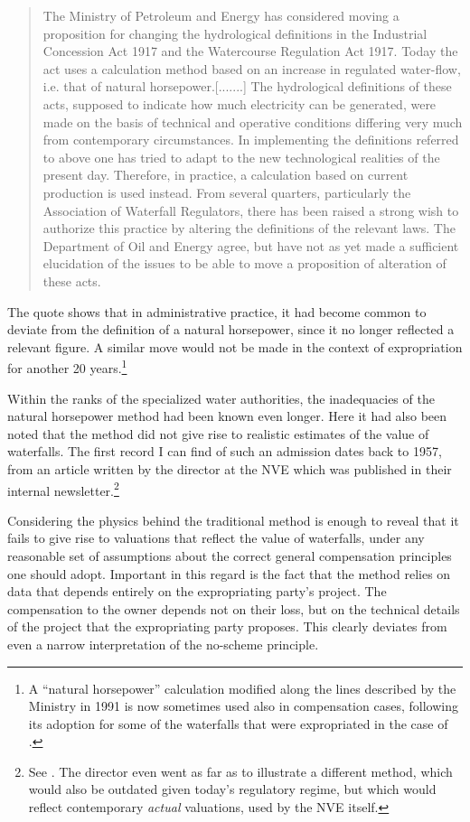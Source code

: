 \begin{quote}
The Ministry of Petroleum and Energy has considered moving a proposition for changing the hydrological definitions in the Industrial Concession Act 1917 and the Watercourse Regulation Act 1917. Today the act uses a calculation method based on an increase in regulated water-flow, i.e. that of natural horsepower.[.......] The hydrological definitions of these acts, supposed to indicate how much electricity can be generated, were made on the basis of technical and operative conditions differing very much from contemporary circumstances. In implementing the definitions referred to above one has tried to adapt to the new technological realities of the present day. Therefore, in practice, a calculation based on current production is used instead. From several quarters, particularly the Association of Waterfall Regulators, there has been raised a strong wish to authorize this practice by altering the definitions of the relevant laws. The Department of Oil and Energy agree, but have not as yet made a sufficient elucidation of the issues to be able to move a proposition of alteration of these acts.
\end{quote}

The quote shows that in administrative practice, it had become common to deviate from the definition of a natural horsepower, since it no longer reflected a relevant figure. A similar move would not be made in the context of expropriation for another 20 years.\footnote{A ``natural horsepower'' calculation modified along the lines described by the Ministry in 1991 is now sometimes used also in compensation cases, following its adoption for some of the waterfalls that were expropriated in the case of \cite{sauda08}.}

Within the ranks of the specialized water authorities, the inadequacies of the natural horsepower method had been known even longer. Here it had also been noted that the method did not give rise to realistic estimates of the value of waterfalls. The first record I can find of such an admission dates back to 1957, from an article written by the director at the NVE which was published in their internal newsletter.\footnote{See \cite{....}. The director even went as far as to illustrate a different method, which would also be outdated given today's regulatory regime, but which would reflect contemporary \emph{actual} valuations, used by the NVE itself.}

Considering the physics behind the traditional method is enough to reveal that it fails to give rise to valuations that reflect the value of waterfalls, under any reasonable set of assumptions about the correct general compensation principles one should adopt. Important in this regard is the fact that  the method relies on data that depends entirely on the expropriating party's project. The compensation to the owner depends not on their loss, but on the technical details of the project that the expropriating party proposes. This clearly deviates from even a narrow interpretation of the no-scheme principle.

